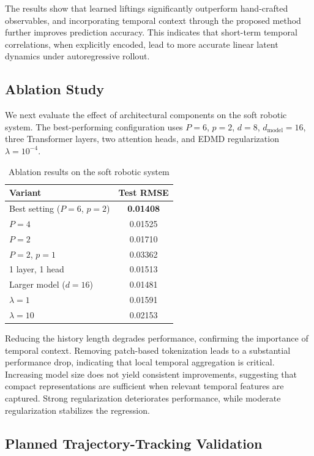 \documentclass[journal]{IEEEtran}
\begin{document}
The results show that learned liftings significantly outperform hand-crafted observables, and incorporating temporal context through the proposed method further improves prediction accuracy. This indicates that short-term temporal correlations, when explicitly encoded, lead to more accurate linear latent dynamics under autoregressive rollout.

\subsection{Ablation Study}

We next evaluate the effect of architectural components on the soft robotic system. The best-performing configuration uses $P=6$, $p=2$, $d=8$, $d_{\mathrm{model}}=16$, three Transformer layers, two attention heads, and EDMD regularization $\lambda=10^{-4}$.

\begin{table}[!t]
\renewcommand{\arraystretch}{1.2}
\caption{Ablation results on the soft robotic system}
\label{tab:ablation_platform_b}
\centering
\begin{tabular}{p{}c}
\toprule
Variant & Test RMSE \\
\midrule
Best setting ($P=6$, $p=2$) & \textbf{0.01408} \\
$P=4$ & 0.01525 \\
$P=2$ & 0.01710 \\
$P=2$, $p=1$ & 0.03362 \\
1 layer, 1 head & 0.01513 \\
Larger model ($d=16$) & 0.01481 \\
$\lambda=1$ & 0.01591 \\
$\lambda=10$ & 0.02153 \\
\bottomrule
\end{tabular}
\end{table}


Reducing the history length degrades performance, confirming the importance of temporal context. Removing patch-based tokenization leads to a substantial performance drop, indicating that local temporal aggregation is critical. Increasing model size does not yield consistent improvements, suggesting that compact representations are sufficient when relevant temporal features are captured. Strong regularization deteriorates performance, while moderate regularization stabilizes the regression.

\subsection{Planned Trajectory-Tracking Validation}
\end{document}
